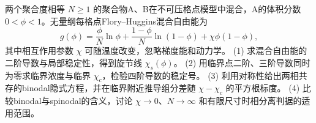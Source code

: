 两个聚合度相等 \(N\ge1\) 的聚合物A、B在不可压格点模型中混合，A的体积分数 \(0<\phi<1\)。无量纲每格点Flory–Huggins混合自由能为
\[
g(\phi)=\frac{\phi}{N}\ln\phi+\frac{1-\phi}{N}\ln(1-\phi)+\chi\phi(1-\phi),
\]
其中相互作用参数 \(\chi\) 可随温度改变，忽略梯度能和动力学。
(1) 求混合自由能的二阶导数与局部稳定性，得到旋节线 \(\chi_s(\phi)\)。
(2) 用临界点二阶、三阶导数同时为零求临界浓度与临界 \(\chi_c\)，检验四阶导数的稳定号。
(3) 利用对称性给出两相共存的binodal隐式方程，并在临界附近推导组分差随 \(\chi-\chi_c\) 的平方根标度。
(4) 比较binodal与spinodal的含义，讨论 \(\chi\to0\)、\(N\to\infty\) 和有限尺寸时相分离判据的适用范围。
